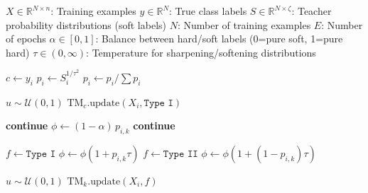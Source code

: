 \documentclass[sn-mathphys-num]{sn-jnl}%
\theoremstyle{thmstyleone}%
\theoremstyle{thmstyletwo}%
\theoremstyle{thmstylethree}%
\providecommand{\DIFaddend}{} %
\DeclareRobustCommand{\DIFaddend}{\DIFOaddend \let\includegraphics\DIFOincludegraphics} %
\begin{document}
\begin{algorithm}[htbp]
\DIFaddend \caption{Tsetlin Machine fit method using soft label distributions}
\label{algo:fit-soft}
\begin{algorithmic}[1]
\Require $X\in\mathbb{R}^{N \times n}$: Training examples
\Require $y\in\mathbb{R}^{N}$: True class labels
\Require $S\in\mathbb{R}^{N \times \zeta}$: Teacher probability distributions (soft labels)
\Require $N$: Number of training examples
\Require $E$: Number of epochs
\Require $\alpha \in [0,1]$: Balance between hard/soft labels (0=pure soft, 1=pure hard)
\Require $\tau \in (0,\infty)$: Temperature for sharpening/softening distributions

            \State $c \gets y_i$ 
            \State $p_i \gets S_i^{1/\tau^2}$ 
            \State $p_i \gets p_i / \sum p_i$ 

            \State $u \sim \mathcal{U}(0,1)$
                \State $\text{TM}_c.\text{update}(X_i, \texttt{Type I})$
            \EndIf

                 
                    \State \textbf{continue}
                \EndIf
                \State $\phi \gets (1 - \alpha) \, p_{i,k}$ 
                 
                    \State \textbf{continue}
                \EndIf

                    \State $f \gets \texttt{Type I}$ 
                    \State $\phi \gets \phi (1 + p_{i,k} \tau)$
                \Else
                    \State $f \gets \texttt{Type II}$ 
                    \State $\phi \gets \phi (1 + (1 - p_{i,k}) \tau)$
                \EndIf

                \State $u \sim \mathcal{U}(0,1)$ 
                    \State $\text{TM}_k.\text{update}(X_i, f)$
                \EndIf
            \EndFor
        \EndFor
    \EndFor
\EndFunction
\end{algorithmic}
\end{algorithm}
\end{document}
